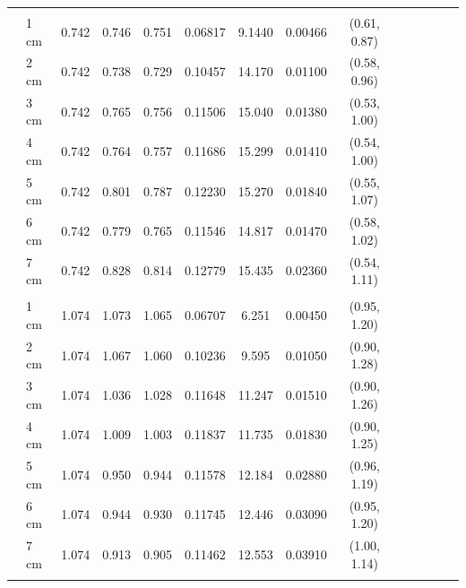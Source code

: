\documentclass[a4paper 12pt]{article}
\numberwithin{equation}{section}
\begin{document}
\begin{small}
\begin{table}[h!]
\begin{footnotesize}
\begin{tabular}{clclclclclclcl}
 \raisebox{1ex}{\bf age 5}  \\ [1.0ex]
&   1 cm & 0.742 &    0.746 & 0.751 &          0.06817& 9.1440 & 0.00466 & (0.61, 0.87)\\
&   2 cm & 0.742 &    0.738 & 0.729 &          0.10457& 14.170 & 0.01100 & (0.58, 0.96)\\
&   3 cm & 0.742 &    0.765 & 0.756 &          0.11506& 15.040 & 0.01380 & (0.53, 1.00)\\
&   4 cm & 0.742 &    0.764 & 0.757 &          0.11686& 15.299 & 0.01410 & (0.54, 1.00)\\
&   5 cm & 0.742 &    0.801 & 0.787 &          0.12230& 15.270 & 0.01840 & (0.55, 1.07)\\
&   6 cm & 0.742 &    0.779 & 0.765 &          0.11546& 14.817 & 0.01470 & (0.58, 1.02)\\
&   7 cm & 0.742 &    0.828 & 0.814 &          0.12779& 15.435 & 0.02360 & (0.54, 1.11) \\[1.5ex]

 \raisebox{1ex}{\bf age 6+}  \\ [1.0ex]
&   1 cm & 1.074 &    1.073 & 1.065 &          0.06707& 6.251  & 0.00450 & (0.95, 1.20)\\
&   2 cm & 1.074 &    1.067 & 1.060 &          0.10236& 9.595  & 0.01050 & (0.90, 1.28)\\
&   3 cm & 1.074 &    1.036 & 1.028 &          0.11648& 11.247 & 0.01510 & (0.90, 1.26)\\
&   4 cm & 1.074 &    1.009 & 1.003 &          0.11837& 11.735 & 0.01830 & (0.90, 1.25)\\
&   5 cm & 1.074 &    0.950 & 0.944 &          0.11578& 12.184 & 0.02880 & (0.96, 1.19)\\
&   6 cm & 1.074 &    0.944 & 0.930 &          0.11745& 12.446 & 0.03090 & (0.95, 1.20)\\
&   7 cm & 1.074 &    0.913 & 0.905 &          0.11462& 12.553 & 0.03910 & (1.00, 1.14) \\[1.5ex]
  \hline \\
\end{tabular}
\end{footnotesize}
\end{table}
 \end{small}
\end{document}
